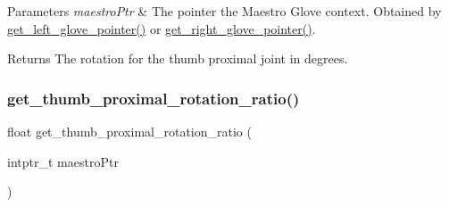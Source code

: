 \begin{DoxyParams}{Parameters}
{\em maestro\+Ptr} & The pointer the Maestro Glove context. Obtained by \hyperlink{group__glove_management_ga63ce3c99d4a8b8db851b22af9185764e}{get\+\_\+left\+\_\+glove\+\_\+pointer()} or \hyperlink{group__glove_management_ga9b8fd9d91aeac3f8da50f7a7eba0c32b}{get\+\_\+right\+\_\+glove\+\_\+pointer()}. \\
\hline
\end{DoxyParams}
\begin{DoxyReturn}{Returns}
The rotation for the thumb proximal joint in degrees. 
\end{DoxyReturn}
\mbox{\label{group__rotation_access_ga6757e84fae5850e95bf380b534a1dd14}} 
\subsubsection{\texorpdfstring{get\+\_\+thumb\+\_\+proximal\+\_\+rotation\+\_\+ratio()}{get\_thumb\_proximal\_rotation\_ratio()}}
{\footnotesize\ttfamily float get\+\_\+thumb\+\_\+proximal\+\_\+rotation\+\_\+ratio (\begin{DoxyParamCaption}\item[{intptr\+\_\+t}]{maestro\+Ptr }\end{DoxyParamCaption})}


